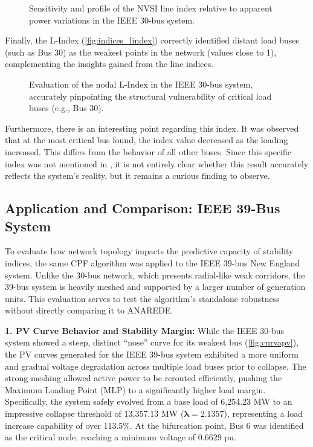 \documentclass{ieeeaccess}
\begin{document}
\begin{figure}[htbp]
    \centering
    
    \caption{Sensitivity and profile of the NVSI line index relative to apparent power variations in the IEEE 30-bus system.}
    \label{fig:indices_nvsi}
\end{figure}

Finally, the L-Index (\autoref{fig:indices_lindex}) correctly identified distant load buses (such as Bus 30) as the weakest points in the network (values close to 1), complementing the insights gained from the line indices.

\begin{figure}[htbp]
    \centering
    
    \caption{Evaluation of the nodal L-Index in the IEEE 30-bus system, accurately pinpointing the structural vulnerability of critical load buses (e.g., Bus 30).}
    \label{fig:indices_lindex}
\end{figure}

Furthermore, there is an interesting point regarding this index. It was observed that at the most critical bus found, the index value decreased as the loading increased. This differs from the behavior of all other buses. Since this specific index was not mentioned in \cite{madureira2023avaliacao}, it is not entirely clear whether this result accurately reflects the system's reality, but it remains a curious finding to observe.

\subsection{Application and Comparison: IEEE 39-Bus System}
To evaluate how network topology impacts the predictive capacity of stability indices, the same CPF algorithm was applied to the IEEE 39-bus New England system. Unlike the 30-bus network, which presents radial-like weak corridors, the 39-bus system is heavily meshed and supported by a larger number of generation units. This evaluation serves to test the algorithm's standalone robustness without directly comparing it to ANAREDE.

\textbf{1. PV Curve Behavior and Stability Margin:}
While the IEEE 30-bus system showed a steep, distinct ``nose'' curve for its weakest bus (\autoref{fig:curvapv}), the PV curves generated for the IEEE 39-bus system exhibited a more uniform and gradual voltage degradation across multiple load buses prior to collapse. The strong meshing allowed active power to be rerouted efficiently, pushing the Maximum Loading Point (MLP) to a significantly higher load margin. Specifically, the system safely evolved from a base load of 6,254.23 MW to an impressive collapse threshold of 13,357.13 MW ($\bm{\lambda} = 2.1357$), representing a load increase capability of over 113.5\%. At the bifurcation point, Bus 6 was identified as the critical node, reaching a minimum voltage of 0.6629 pu.
\end{document}
